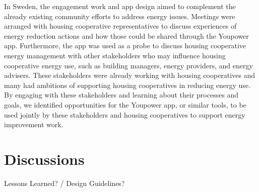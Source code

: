 In Sweden, the engagement work and app design aimed to complement the already existing community efforts to address energy issues. Meetings were arranged with housing cooperative representatives to discuss experiences of energy reduction actions and how those could be shared through the Youpower app. Furthermore, the app was used as a probe to discuss housing cooperative energy management with other stakeholders who may influence housing cooperative energy use, such as building managers, energy providers, and energy advisers. These stakeholders were already working with housing cooperatives and many had ambitions of supporting housing cooperatives in reducing energy use. By engaging with these stakeholders and learning about their processes and goals, we identified opportunities for the Youpower app, or similar tools, to be used jointly by these stakeholders and housing cooperatives to support energy improvement work.

\section{Discussions} %
\label{sec:disc}

\begin{svgraybox}
Lessons Learned?  / Design Guidelines? 
\end{svgraybox}